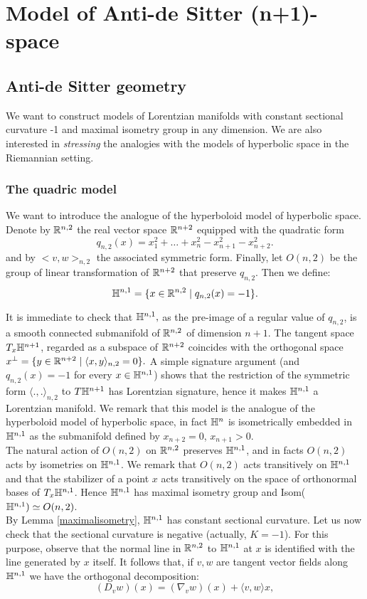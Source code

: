 \chapter{Model of Anti-de Sitter (n+1)-space}
\section{Anti-de Sitter geometry}
We want to construct models of Lorentzian manifolds with constant sectional curvature -1 and maximal isometry group in any dimension. We are also interested in \textit{stressing} the analogies with the models of hyperbolic space in the Riemannian setting. 

\subsection{The quadric model}
We want to introduce the analogue of the hyperboloid model of hyperbolic space. Denote by $\mathbb{R}^{n,2}$ the real vector space $\mathbb{R}^{n+2}$ equipped with the quadratic form 
\[
    q_{n,2}(x)=x_1^{2}+\dots+x_n^{2}-x_{n+1}^{2}-x_{n+2}^2.   
\]
and by $<v,w>_{n,2}$ the associated symmetric form. Finally, let $O(n,2)$ be the group of linear transformation of $\mathbb{R}^{n+2}$ that preserve $q_{n,2}.$
Then we define: 
\[
    \mathbb{H}^{n,1}=\{x\in \mathbb{R}^{n,2}\;|\;q_{n,2}(x)=-1\}.
\]

It is immediate to check that $\mathbb{H}^{n,1},$ as the pre-image of a regular value of $q_{n,2}$, is a smooth connected submanifold of $\mathbb{R}^{n,2}$ of dimension $n+1$. The tangent space $T_x\mathbb{H}^{n+1}$, regarded as a subspace of $\mathbb{R}^{n+2}$ coincides with the orthogonal space $x^{\perp}=\{y\in \mathbb{R}^{n+2}\;|\;\langle x,y\rangle_{n,2}=0\}.$ A simple signature argument (and $q_{n,2}(x)=-1$ for every $x\in\mathbb{H}^{n,1}$) shows that the restriction of the symmetric form $\langle .,. \rangle_{n,2}$ to $T\mathbb{H}^{n+1}$ has Lorentzian signature, hence it makes $\mathbb{H}^{n,1}$ a Lorentzian manifold. We remark that this model is the analogue of the hyperboloid model of hyperbolic space, in fact $\mathbb{H}^n$ is isometrically embedded in $\mathbb{H}^{n,1}$ as the submanifold defined by $x_{n+2}=0$, $x_{n+1}>0$. \\
The natural action of $O(n,2)$ on $\mathbb{R}^{n,2}$ preserves $\mathbb{H}^{n,1}$, and in facts $O(n,2)$ acts by isometries on $\mathbb{H}^{n,1}$. We remark that $O(n,2)$ acts transitively on $\mathbb{H}^{n,1}$ and that the stabilizer of a point $x$ acts transitively on the space of orthonormal bases of $T_x\mathbb{H}^{n,1}$. Hence $\mathbb{H}^{n,1}$ has maximal isometry group and Isom($\mathbb{H}^{n,1})\simeq O(n,2)$.\\
By Lemma \ref{maximalisometry}, $\mathbb{H}^{n,1}$ has constant sectional curvature. Let us now check that the sectional curvature is negative (actually, $K=-1$). For this purpose, observe that the normal line in $\mathbb{R}^{n,2}$ to $\mathbb{H}^{n,1}$ at $x$ is identified with the line generated by $x$ itself. It follows that, if $v,w$ are tangent vector fields along $\mathbb{H}^{n,1}$ we have the orthogonal decomposition: 
\[
    (D_{v}w)(x)=(\nabla_{v}w)(x)+\langle v,w\rangle x, 
\]

